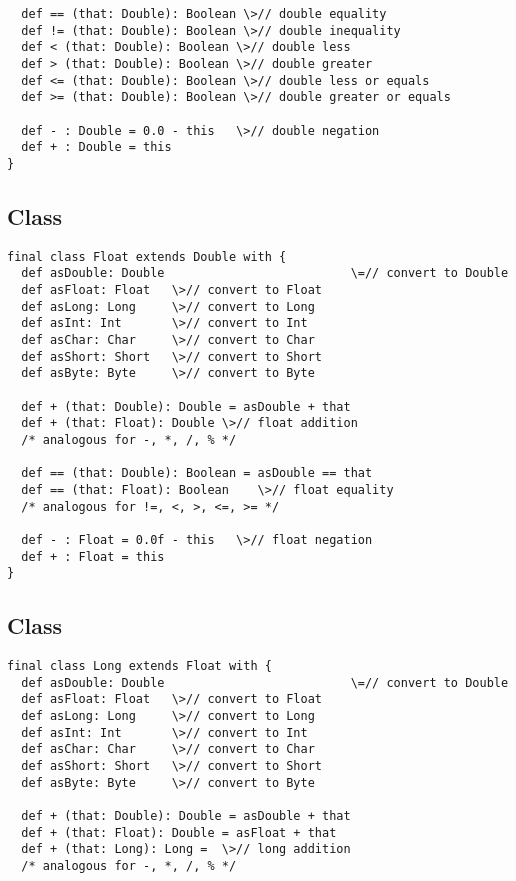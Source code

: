 \documentclass[11pt]{report}
\begin{document}
\begin{itemize}
\begin{verbatim}
  def == (that: Double): Boolean \>// double equality
  def != (that: Double): Boolean \>// double inequality
  def < (that: Double): Boolean \>// double less
  def > (that: Double): Boolean \>// double greater
  def <= (that: Double): Boolean \>// double less or equals
  def >= (that: Double): Boolean \>// double greater or equals

  def - : Double = 0.0 - this   \>// double negation
  def + : Double = this
}
\end{verbatim}

\subsection{Class }

\begin{verbatim}
final class Float extends Double with {
  def asDouble: Double                          \=// convert to Double
  def asFloat: Float   \>// convert to Float
  def asLong: Long     \>// convert to Long
  def asInt: Int       \>// convert to Int
  def asChar: Char     \>// convert to Char
  def asShort: Short   \>// convert to Short
  def asByte: Byte     \>// convert to Byte

  def + (that: Double): Double = asDouble + that
  def + (that: Float): Double \>// float addition
  /* analogous for -, *, /, % */

  def == (that: Double): Boolean = asDouble == that
  def == (that: Float): Boolean    \>// float equality
  /* analogous for !=, <, >, <=, >= */

  def - : Float = 0.0f - this   \>// float negation
  def + : Float = this
}
\end{verbatim}

\subsection{Class }

\begin{verbatim}
final class Long extends Float with {
  def asDouble: Double                          \=// convert to Double
  def asFloat: Float   \>// convert to Float
  def asLong: Long     \>// convert to Long
  def asInt: Int       \>// convert to Int
  def asChar: Char     \>// convert to Char
  def asShort: Short   \>// convert to Short
  def asByte: Byte     \>// convert to Byte

  def + (that: Double): Double = asDouble + that
  def + (that: Float): Double = asFloat + that
  def + (that: Long): Long =  \>// long addition
  /* analogous for -, *, /, % */


\end{verbatim}
\end{itemize}
\end{document}
